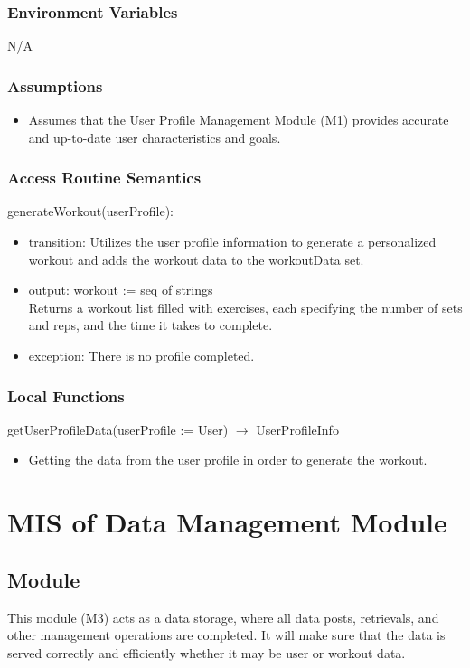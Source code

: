 \documentclass[12pt, titlepage]{article}
\begin{document}
\subsubsection{Environment Variables}
N/A

\subsubsection{Assumptions}
\begin{itemize}
\item Assumes that the User Profile Management Module (M1) provides accurate and up-to-date user characteristics and goals.
\end{itemize}


\subsubsection{Access Routine Semantics}

\noindent generateWorkout(userProfile):
\begin{itemize}
\item transition: Utilizes the user profile information to generate a personalized workout and adds the workout data to the workoutData set.
\item output: workout := seq of strings\\
Returns a workout list filled with exercises, each specifying the number of sets and reps, and the time it takes to complete.
\item exception: There is no profile completed.
\end{itemize}

\subsubsection{Local Functions}
\noindent getUserProfileData(userProfile := User) $\rightarrow$ UserProfileInfo
\begin{itemize}
\item Getting the data from the user profile in order to generate the workout.
\end{itemize}

\section{MIS of Data Management Module}

\subsection{Module}
This module (M3) acts as a data storage, where all data posts, retrievals, and other management operations are completed. It will make sure that the data is served correctly and efficiently whether it may be user or workout data. 
\end{document}
